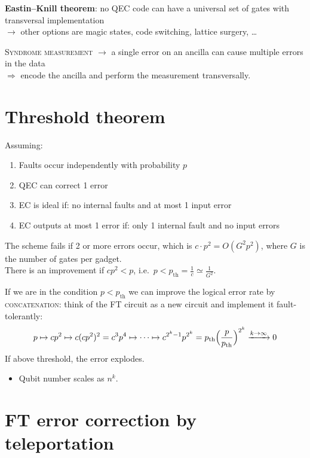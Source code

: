 \documentclass[11pt,a4paper]{article}
\begin{document}
\textbf{Eastin--Knill theorem}: no QEC code can have a universal set of gates with transversal implementation\\
$\to$ other options are magic states, code switching, lattice surgery, \dots

\textsc{Syndrome measurement} $\to$ a single error on an ancilla can cause multiple errors in the data\\
$\Rightarrow$ encode the ancilla and perform the measurement transversally.

\section{Threshold theorem}

Assuming:
\begin{enumerate}
  \item Faults occur independently with probability $p$
  \item QEC can correct 1 error
  \item EC is ideal if: no internal faults and at most 1 input error
  \item EC outputs at most 1 error if: only 1 internal fault and no input errors
\end{enumerate}
The scheme fails if 2 or more errors occur, which is $c\cdot p^2 = O(G^2p^2)$, where $G$ is the number of gates per gadget.\\
There is an improvement if $cp^2<p$, i.e.\ $p<p_{\mathrm{th}} = \frac1c\simeq\frac{1}{G^2}$.

If we are in the condition $p<p_{\mathrm{th}}$ we can improve the logical error rate by \textsc{concatenation}: think of the FT circuit as a new circuit and implement it fault-tolerantly:
\[
p\mapsto cp^2\mapsto c(cp^2)^2 = c^3p^4\mapsto\dots\mapsto c^{2^k-1}p^{2^k} = p_{\mathrm{th}}\Bigl(\frac{p}{p_{\mathrm{th}}}\Bigr)^{2^k}\xrightarrow{k\to\infty}0
\]
If above threshold, the error explodes.
\begin{itemize}
  \item Qubit number scales as $n^k$.
\end{itemize}

\section{FT error correction by teleportation}
\end{document}
